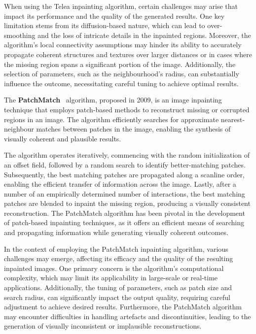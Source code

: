 When using the Telea inpainting algorithm, certain challenges may arise that impact its performance and the quality of the generated results. One key limitation stems from its diffusion-based nature, which can lead to over-smoothing and the loss of intricate details in the inpainted regions. Moreover, the algorithm's local connectivity assumptions may hinder its ability to accurately propagate coherent structures and textures over larger distances or in cases where the missing region spans a significant portion of the image. Additionally, the selection of parameters, such as the neighbourhood's radius, can substantially influence the outcome, necessitating careful tuning to achieve optimal results.


The \textbf{PatchMatch}~\supercite{patchmatch} algorithm, proposed in 2009, is an image inpainting technique that employs patch-based methods to reconstruct missing or corrupted regions in an image. The algorithm efficiently searches for approximate nearest-neighbour matches between patches in the image, enabling the synthesis of visually coherent and plausible results.

The algorithm operates iteratively, commencing with the random initialization of an offset field, followed by a random search to identify better-matching patches. Subsequently, the best matching patches are propagated along a scanline order, enabling the efficient transfer of information across the image. Lastly, after a number of an empirically determined number of interactions, the best matching patches are blended to inpaint the missing region, producing a visually consistent reconstruction. The PatchMatch algorithm has been pivotal in the development of patch-based inpainting techniques, as it offers an efficient means of searching and propagating information while generating visually coherent outcomes.

In the context of employing the PatchMatch inpainting algorithm, various challenges may emerge, affecting its efficacy and the quality of the resulting inpainted images. One primary concern is the algorithm's computational complexity, which may limit its applicability in large-scale or real-time applications. Additionally, the tuning of parameters, such as patch size and search radius, can significantly impact the output quality, requiring careful adjustment to achieve desired results. Furthermore, the PatchMatch algorithm may encounter difficulties in handling artefacts and discontinuities, leading to the generation of visually inconsistent or implausible reconstructions.
